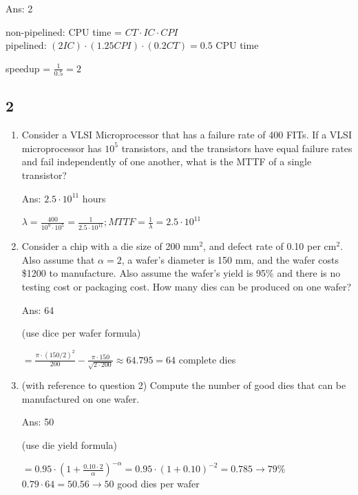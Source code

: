 \documentclass[12pt]{article}
\begin{document}
\begin{enumerate}
        Ans: 2

        non-pipelined: CPU time = $CT \cdot IC \cdot CPI$\\
        pipelined: $(2 IC) \cdot (1.25 CPI) \cdot (0.2 CT) = 0.5$ CPU time

        speedup = $\frac{1}{0.5} = 2$

    \end{enumerate}

    \subsection{2}

    \begin{enumerate}
        \item Consider a VLSI Microprocessor that has a failure rate of 400 FITs. If a VLSI microprocessor has $10^5$ 
        transistors, and the transistors have equal failure rates and fail independently of one another, what is the 
        MTTF of a single transistor?

        Ans: $2.5 \cdot 10^{11}$ hours

        $\lambda = \frac{400}{10^9 \cdot 10^5} = \frac{1}{2.5 \cdot 10^{11}}; MTTF = \frac{1}{\lambda} = 2.5 \cdot 10^{11}$

        \item Consider a chip with a die size of 200 mm$^2$, and defect rate of 0.10 per cm$^2$. Also assume that 
        $\alpha = 2$, a wafer's diameter is 150 mm, and the wafer costs \$1200 to manufacture. Also assume the wafer's 
        yield is 95\% and there is no testing cost or packaging cost. How many dies can be produced on one wafer?

        Ans: 64

        (use dice per wafer formula)

        $= \frac{\pi \cdot (150/2)^2}{200} - \frac{\pi \cdot 150}{\sqrt{2 \cdot 200}} \approx 64.795 = 64$ complete dies

        \item (with reference to question 2) Compute the number of good dies that can be manufactured on one wafer.
        
        Ans: 50

        (use die yield formula)

        $ = 0.95 \cdot (1 + \frac{0.10 \cdot 2}{\alpha})^{-\alpha} = 0.95 \cdot (1 + 0.10)^{-2} = 0.785 \longrightarrow 79\%$\\
        $0.79 \cdot 64 = 50.56 \longrightarrow 50$ good dies per wafer


\end{enumerate}
\end{document}
